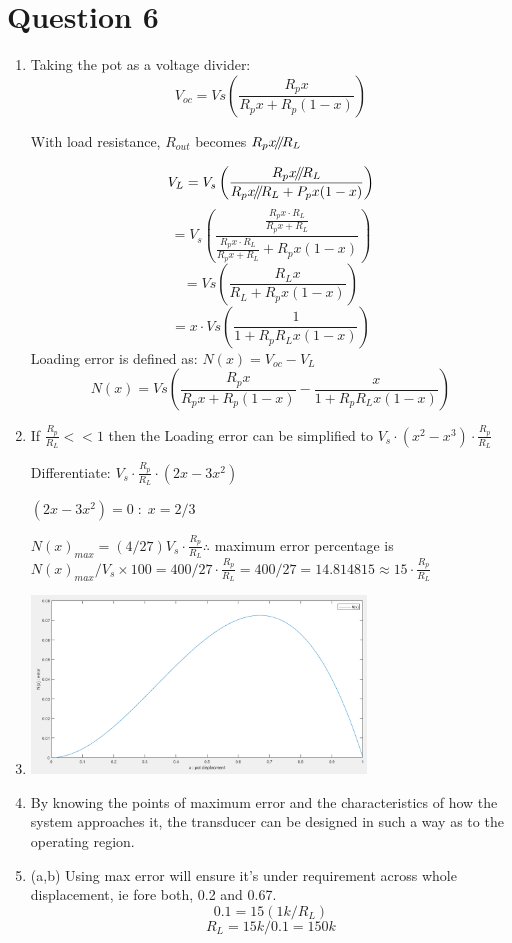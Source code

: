 \documentclass[11pt]{article}
\newcommand{\parallelsum}{\mathbin{\!/\mkern-5mu/\!}}
\begin{document}
\section*{Question 6}
\begin{enumerate}[label=\roman*)]
        \item Taking the pot as a voltage divider:
                $$V_{oc} = Vs\left(\frac{R_{p}x}{R_{p}x + R_{p}(1-x)}\right)$$

                With load resistance, $R_{out}$ becomes $R_px{\parallelsum}R_L$

                $$V_L = V_s\left( \frac{R_px{\parallelsum}R_L}{R_px{\parallelsum}R_L + P_px(1-x)} \right)$$
                $$= V_s\left( \frac{\frac{R_px{\cdot}R_L}{R_px+R_L}}{\frac{R_px{\cdot}R_L}{R_px+R_L} + R_px(1-x)} \right)$$
                $$=Vs\left( \frac{R_Lx}{R_L + R_px(1-x)} \right)$$
                $$=x{\cdot}Vs\left( \frac{1}{1 + {R_p}{R_L}x(1-x)} \right)$$
                Loading error is defined as: $N(x) = V_{oc} - V_L$ 
                $$N(x) = Vs\left( \frac{R_{p}x}{R_{p}x + R_{p}(1-x)} -  \frac{x}{1 + {R_p}{R_L}x(1-x)}\right)$$
        \item If $\frac{R_p}{R_L} << 1$ then the Loading error can be simplified to $V_s{\cdot}(x^2 - x^3){\cdot}\frac{R_p}{R_L}$

        Differentiate: $V_s{\cdot}\frac{R_p}{R_L}{\cdot}(2x - 3x^2)$

        $(2x - 3x^2)=0\;:\;x=2/3$

        $N(x)_{max} = (4/27)V_s{\cdot}\frac{R_p}{R_L} \therefore$ maximum error percentage is $N(x)_{max}/V_s {\times} 100 = 400/27{\cdot}\frac{R_p}{R_L} = 400/27 = 14.814815 \approx 15{\cdot}\frac{R_p}{R_L}$ 
        \item \includegraphics[width=0.7\textwidth]{error_plot.png}
        \item By knowing the points of maximum error and the characteristics of how the system approaches it, the transducer can be designed in such a way as to the operating region. 
        \item (a,b) Using max error will ensure it's under requirement across whole displacement, ie fore both, 0.2 and 0.67. 
        $$0.1 = 15(1k/R_L)$$
        $$R_L = 15k/0.1=150k$$
\end{enumerate}
\end{document}
